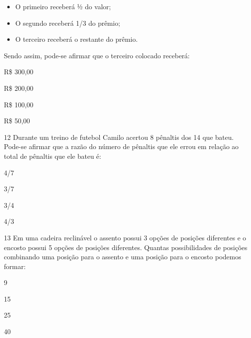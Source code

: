 \begin{itemize}
\item
  O primeiro receberá ½ do valor;
\item
  O segundo receberá 1/3 do prêmio;
\item
  O terceiro receberá o restante do prêmio.
\end{itemize}

Sendo assim, pode-se afirmar que o terceiro colocado receberá:


\begin{escolha}
\item
  R\$ 300,00
\item
  R\$ 200,00
\item
  R\$ 100,00
\item
  R\$ 50,00
\end{escolha}


\pagebreak
\num{12} Durante um treino de futebol Camilo acertou 8 pênaltis dos 14
que bateu. Pode-se afirmar que a razão do número de pênaltis que ele
errou em relação ao total de pênaltis que ele bateu é:

\begin{minipage}{.5\textwidth}
\begin{escolha}
\item
  4/7
\item
  3/7
\item
  3/4
\item
  4/3
\end{escolha}
\end{minipage}


\num{13} Em uma cadeira reclinável o assento possui 3 opções de posições
diferentes e o encosto possui 5 opções de posições diferentes. Quantas
possibilidades de posições combinando uma posição para o assento e uma
posição para o encosto podemos formar:

\begin{minipage}{.5\textwidth}
\begin{escolha}
\item
  9
\item
  15
\item
  25
\item
  40
\end{escolha}
\end{minipage}


